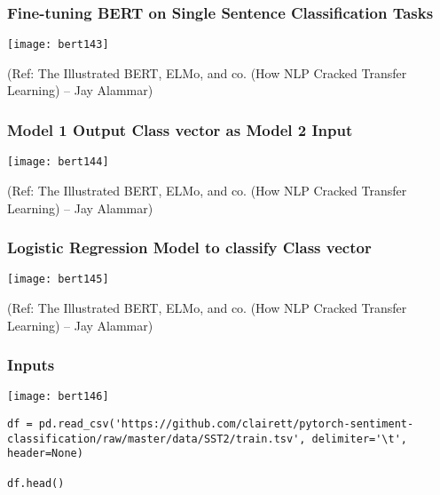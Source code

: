 \begin{frame}[fragile]\frametitle{ Fine-tuning BERT on Single Sentence Classification Tasks}

			\begin{center}
			\texttt{[image: bert143]}
			\end{center}	

{\tiny (Ref: The Illustrated BERT, ELMo, and co. (How NLP Cracked Transfer Learning) – Jay Alammar)}

\end{frame}

\begin{frame}[fragile]\frametitle{ Model 1 Output Class vector as Model 2 Input}

			\begin{center}
			\texttt{[image: bert144]}
			\end{center}	

{\tiny (Ref: The Illustrated BERT, ELMo, and co. (How NLP Cracked Transfer Learning) – Jay Alammar)}

\end{frame}

\begin{frame}[fragile]\frametitle{ Logistic Regression Model to classify Class vector }

			\begin{center}
			\texttt{[image: bert145]}
			\end{center}	

{\tiny (Ref: The Illustrated BERT, ELMo, and co. (How NLP Cracked Transfer Learning) – Jay Alammar)}

\end{frame}

\begin{frame}[fragile]\frametitle{Inputs}



			\begin{center}
			\texttt{[image: bert146]}
			\end{center}	

\begin{lstlisting}
df = pd.read_csv('https://github.com/clairett/pytorch-sentiment-classification/raw/master/data/SST2/train.tsv', delimiter='\t', header=None)

df.head()
\end{lstlisting}


\end{frame}

